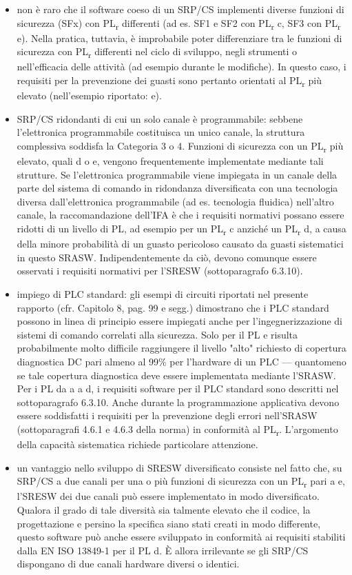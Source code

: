 \begin{itemize}
    \item non è raro che il software coeso di un SRP/CS implementi diverse funzioni di sicurezza (SFx) con PL\textsubscript{r} differenti (ad es. SF1 e SF2 con PL\textsubscript{r} c, SF3 con PL\textsubscript{r} e). Nella pratica, tuttavia, è improbabile poter differenziare tra le funzioni di sicurezza con PL\textsubscript{r} differenti nel ciclo di sviluppo, negli strumenti o nell'efficacia delle attività (ad esempio durante le modifiche). In questo caso, i requisiti per la prevenzione dei guasti sono pertanto orientati al PL\textsubscript{r} più elevato (nell'esempio riportato: e).
    \item SRP/CS ridondanti di cui un solo canale è programmabile: sebbene l'elettronica programmabile costituisca un unico canale, la struttura complessiva soddisfa la Categoria 3 o 4. Funzioni di sicurezza con un PL\textsubscript{r} più elevato, quali d o e, vengono frequentemente implementate mediante tali strutture. Se l'elettronica programmabile viene impiegata in un canale della parte del sistema di comando in ridondanza diversificata con una tecnologia diversa dall'elettronica programmabile (ad es. tecnologia fluidica) nell'altro canale, la raccomandazione dell'IFA è che i requisiti normativi possano essere ridotti di un livello di PL, ad esempio per un PL\textsubscript{r} c anziché un PL\textsubscript{r} d, a causa della minore probabilità di un guasto pericoloso causato da guasti sistematici in questo SRASW. Indipendentemente da ciò, devono comunque essere osservati i requisiti normativi per l'SRESW (sottoparagrafo 6.3.10).
    \item impiego di PLC standard: gli esempi di circuiti riportati nel presente rapporto (cfr. Capitolo 8, pag. 99 e segg.) dimostrano che i PLC standard possono in linea di principio essere impiegati anche per l'ingegnerizzazione di sistemi di comando correlati alla sicurezza. Solo per il PL e risulta probabilmente molto difficile raggiungere il livello "alto" richiesto di copertura diagnostica DC pari almeno al 99\% per l'hardware di un PLC — quantomeno se tale copertura diagnostica deve essere implementata mediante l'SRASW. Per i PL da a a d, i requisiti software per il PLC standard sono descritti nel sottoparagrafo 6.3.10. Anche durante la programmazione applicativa devono essere soddisfatti i requisiti per la prevenzione degli errori nell'SRASW (sottoparagrafi 4.6.1 e 4.6.3 della norma) in conformità al PL\textsubscript{r}. L'argomento della capacità sistematica richiede particolare attenzione.
    \item un vantaggio nello sviluppo di SRESW diversificato consiste nel fatto che, su SRP/CS a due canali per una o più funzioni di sicurezza con un PL\textsubscript{r} pari a e, l'SRESW dei due canali può essere implementato in modo diversificato. Qualora il grado di tale diversità sia talmente elevato che il codice, la progettazione e persino la specifica siano stati creati in modo differente, questo software può anche essere sviluppato in conformità ai requisiti stabiliti dalla EN ISO 13849-1 per il PL d. È allora irrilevante se gli SRP/CS dispongano di due canali hardware diversi o identici.
\end{itemize}

